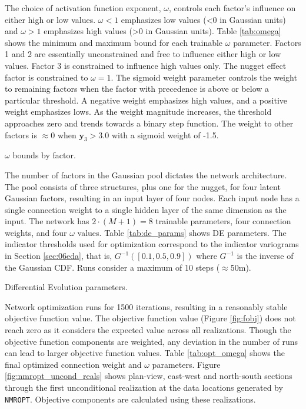 The choice of activation function exponent, $\omega$, controls each factor's influence on either high or low values. $\omega < 1$ emphasizes low values (<0 in Gaussian units) and $\omega > 1$ emphasizes high values (>0 in Gaussian units). Table \ref{tab:omega} shows the minimum and maximum bound for each trainable $\omega$ parameter. Factors 1 and 2 are essentially unconstrained and free to influence either high or low values. Factor 3 is constrained to influence high values only. The nugget effect factor is constrained to $\omega=1$. The sigmoid weight parameter controls the weight to remaining factors when the factor with precedence is above or below a particular threshold. A negative weight emphasizes high values, and a positive weight emphasizes lows. As the weight magnitude increases, the threshold approaches zero and trends towards a binary step function. The weight to other factors is $\approx 0$ when $\mathbf{y}_{3} > 3.0$ with a sigmoid weight of -1.5.

\begin{table}[!htb]
    \centering
    \caption{$\omega$ bounds by factor.}
    \resizebox{0.9\width}{!}{}
    \label{tab:omega}
\end{table}

The number of factors in the Gaussian pool dictates the network architecture. The pool consists of three structures, plus one for the nugget, for four latent Gaussian factors, resulting in an input layer of four nodes. Each input node has a single connection weight to a single hidden layer of the same dimension as the input. The network has $2 \cdot (M+1) = 8$ trainable parameters, four connection weights, and four $\omega$ values. Table \ref{tab:de_params} shows \gls{DE} parameters. The indicator thresholds used for optimization correspond to the indicator variograms in Section \ref{sec:06eda}, that is, $G^{-1}([0.1, 0.5, 0.9])$ where $G^{-1}$ is the inverse of the Gaussian \gls{CDF}. Runs consider a maximum of 10 steps ($\approx$50m).

\begin{table}[!htb]
    \centering
    \caption{Differential Evolution parameters.}
    \resizebox{0.9\width}{!}{}
    \label{tab:de_params}
\end{table}

Network optimization runs for 1500 iterations, resulting in a reasonably stable objective function value. The objective function value (Figure \ref{fig:fobj}) does not reach zero as it considers the expected value across all realizations. Though the objective function components are weighted, any deviation in the number of runs can lead to larger objective function values. Table \ref{tab:opt_omega} shows the final optimized connection weight and  $\omega$ parameters. Figure \ref{fig:nmropt_uncond_reals} shows plan-view, east-west and north-south sections through the first unconditional realization at the data locations generated by \texttt{NMROPT}. Objective components are calculated using these realizations.

